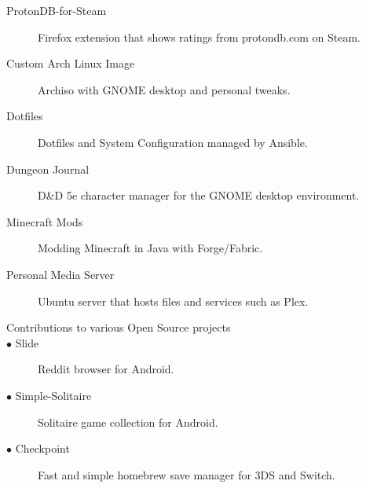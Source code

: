 \documentclass[letterpaper,11pt]{article}
\begin{document}
\begin{description}
\item[ProtonDB-for-Steam] Firefox extension that shows ratings from protondb.com on Steam.
\item[Custom Arch Linux Image] Archiso with GNOME desktop and personal tweaks.
\item[Dotfiles] Dotfiles and System Configuration managed by Ansible.
\item[Dungeon Journal] D\&D 5e character manager for the GNOME desktop environment.
\item[Minecraft Mods] Modding Minecraft in Java with Forge/Fabric.
\item[Personal Media Server] Ubuntu server that hosts files and services such as Plex.
\break
\item[Contributions to various Open Source projects]
\item[\quad $\bullet$ Slide] Reddit browser for Android.
\item[\quad $\bullet$ Simple-Solitaire] Solitaire game collection for Android.
\item[\quad $\bullet$ Checkpoint] Fast and simple homebrew save manager for 3DS and Switch.
\end{description}
\end{document}
